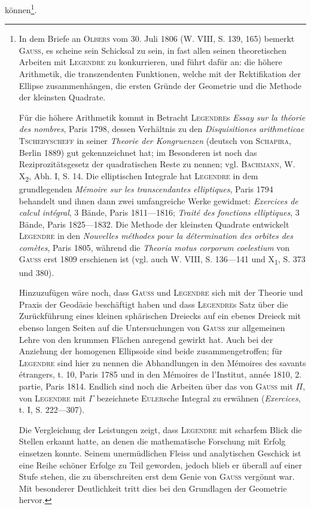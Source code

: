 können\footnote{In dem Briefe an \textsc{Olbers} vom 30. Juli 1806 (W. VIII, S. 139, 165) bemerkt \textsc{Gauss}, es scheine sein
Schicksal zu sein, in fast allen seinen theoretischen Arbeiten mit \textsc{Legendre} zu konkurrieren, und führt
dafür an: die höhere Arithmetik, die transzendenten Funktionen, welche mit der Rektifikation der Ellipse
zusammenhängen, die ersten Gründe der Geometrie und die Methode der kleinsten Quadrate.
\par
Für die höhere Arithmetik kommt in Betracht \textsc{Legendre}s \textit{Essay sur la théorie des nombres}, Paris
1798, dessen Verhältnis zu den \textit{Disquisitiones arithmeticae} \textsc{Tschebyscheff} in seiner \textit{Theorie der Kongruenzen}
(deutsch von \textsc{Schapira}, Berlin 1889) gut gekennzeichnet hat; im Besonderen ist noch das Reziprozitätsgesetz
der quadratischen Reste zu nennen; vgl. \textsc{Bachmann}, W. X\textsubscript{2}, Abh. I, S. 14. Die elliptischen Integrale hat
\textsc{Legendre} in dem grundlegenden \textit{Mémoire sur les transcendantes elliptiques}, Paris 1794 behandelt und ihnen
dann zwei umfangreiche Werke gewidmet: \textit{Exercices de calcul intégral}, 3 Bände, Paris 1811—1816; \textit{Traité
des fonctions elliptiques}, 3 Bände, Paris 1825—1832. Die Methode der kleinsten Quadrate entwickelt \textsc{Legendre}
in den \textit{Nouvelles méthodes pour la détermination des orbites des comètes}, Paris 1805, während die
\textit{Theoria motus corporum coelestium} von \textsc{Gauss} erst 1809 erschienen ist (vgl. auch W. VIII, S. 136—141
und X\textsubscript{1}, S. 373 und 380).
\par
Hinzuzufügen wäre noch, dass \textsc{Gauss} und \textsc{Legendre} sich mit der Theorie und Praxis der Geodäsie
beschäftigt haben und dass \textsc{Legendre}s Satz über die Zurückführung eines kleinen sphärischen Dreiecks
auf ein ebenes Dreieck mit ebenso langen Seiten auf die Untersuchungen von \textsc{Gauss} zur allgemeinen Lehre
von den krummen Flächen anregend gewirkt hat. Auch bei der Anziehung der homogenen Ellipsoide sind
beide zusammengetroffen; für \textsc{Legendre} sind hier zu nennen die Abhandlungen in den Mémoires des savants
étrangers, t. 10, Paris 1785 und in den Mémoires de l’Institut, année 1810, 2. partie, Paris 1814. Endlich
sind noch die Arbeiten über das von \textsc{Gauss} mit \(\Pi\), von \textsc{Legendre} mit \(\Gamma\) bezeichnete \textsc{Euler}sche Integral
zu erwähnen (\textit{Exercices}, t. I, S. 222—307).
\par
Die Vergleichung der Leistungen zeigt, dass \textsc{Legendre} mit scharfem Blick die Stellen erkannt hatte,
an denen die mathematische Forschung mit Erfolg einsetzen konnte. Seinem unermüdlichen Fleiss und
analytischen Geschick ist eine Reihe schöner Erfolge zu Teil geworden, jedoch blieb er überall auf einer
Stufe stehen, die zu überschreiten erst dem Genie von \textsc{Gauss} vergönnt war. Mit besonderer Deutlichkeit
tritt dies bei den Grundlagen der Geometrie hervor.}.
